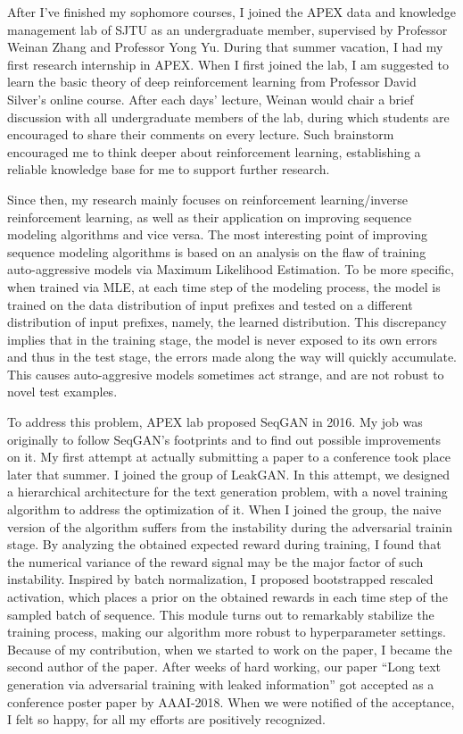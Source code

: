 \documentclass{article}
\begin{document}
      After I've finished my sophomore courses, I joined the APEX data and knowledge management lab of SJTU as an undergraduate member, supervised by Professor Weinan Zhang and Professor Yong Yu. During that summer vacation, I had my first research internship in APEX. When I first joined the lab, I am suggested to learn the basic theory of deep reinforcement learning from Professor David Silver's online course. After each days' lecture, Weinan would chair a brief discussion with all undergraduate members of the lab, during which students are encouraged to share their comments on every lecture. Such brainstorm encouraged me to think deeper about reinforcement learning, establishing a reliable knowledge base for me to support further research. 

      Since then, my research mainly focuses on reinforcement learning/inverse reinforcement learning, as well as their application on improving sequence modeling algorithms and vice versa. The most interesting point of improving sequence modeling algorithms is based on an analysis on the flaw of training auto-aggressive models via Maximum Likelihood Estimation. To be more specific, when trained via MLE, at each time step of the modeling process, the model is trained on the data distribution of input prefixes and tested on a different distribution of input prefixes, namely, the learned distribution. This discrepancy implies that in the training stage, the model is never exposed to its own errors and thus in the test stage, the errors made along the way will quickly accumulate. This causes auto-aggresive models sometimes act strange, and are not robust to novel test examples.

      To address this problem, APEX lab proposed SeqGAN in 2016. My job was originally to follow SeqGAN's footprints and to find out possible improvements on it. My first attempt at actually submitting a paper to a conference took place later that summer. I joined the group of LeakGAN. In this attempt, we designed a hierarchical architecture for the text generation problem, with a novel training algorithm to address the optimization of it. When I joined the group, the naive version of the algorithm suffers from the instability during the adversarial trainin stage. By analyzing the obtained expected reward during training, I found that the numerical variance of the reward signal may be the major factor of such instability. Inspired by batch normalization, I proposed bootstrapped rescaled activation, which places a prior on the obtained rewards in each time step of the sampled batch of sequence. This module turns out to remarkably stabilize the training process, making our algorithm more robust to hyperparameter settings. Because of my contribution, when we started to work on the paper, I became the second author of the paper. After weeks of hard working, our paper ``Long text generation via adversarial training with leaked information'' got accepted as a conference poster paper by AAAI-2018. When we were notified of the acceptance, I felt so happy, for all my efforts are positively recognized.
      
\end{document}
